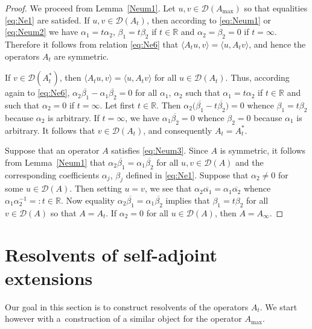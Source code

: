 \documentclass[10pt,a4paper]{amsart}
\numberwithin{equation}{section}
\begin{document}
 \begin{proof}
 We proceed from Lemma~\ref{Neum1}. Let $u,v \in{\mathcal D}(A_{\max})$ so that equalities \eqref{eq:Ne1} are satisfed.
 If $u,v \in{\mathcal D}(A_{t})$, then according to \eqref{eq:Neum1} or \eqref{eq:Neum2} we have $\alpha_{1}= t\alpha_{2}$, $\beta_{1}= t \beta_{2}$ if $t\in {\mathbb R}$ and $\alpha_2= \beta_{2}=0$ if $t=\infty$. Therefore it follows from relation \eqref{eq:Ne6} that $\langle A_{t}u,v \rangle= \langle u, A_{t} v \rangle$, and hence the operators $A_{t} $ are symmetric.

 If $v\in {\mathcal D}(A_{t}^*)$, then $\langle A_{t}u,v \rangle= \langle u, A_{t} v \rangle$ for all $u\in {\mathcal D}(A_{t})$.
 Thus, according again to \eqref{eq:Ne6}, $\alpha_{2} \overline{\beta_{1}}-\alpha_{1} \overline{\beta_{2}}=0$ for all $\alpha_{1}$, $\alpha_{2}$ such that $\alpha_{1}=t \alpha_{2}$ if $t\in {\mathbb R}$ and such that $ \alpha_{2}= 0$ if $t=\infty$.
 Let first $t\in {\mathbb R}$. Then $\alpha_{2} \big( \overline{\beta_{1}}- t \overline{\beta_{2}}\big)=0 $ whence $\beta_{1}=t\beta_{2}$ because $\alpha_{2}$ is arbitrary. If $t=\infty$, we have $\alpha_{1} \overline{\beta_{2}}=0$ whence $\beta_{2}=0$ because $\alpha_1$ is arbitrary. It follows that $v\in {\mathcal D}(A_{t})$, and consequently $A_{t}=A_{t}^*$.

Suppose that an operator $A$ satisfies \eqref{eq:Neum3}. Since $A$ is symmetric, it follows from Lemma~\ref{Neum1} that $\alpha_{2} \overline{\beta_{1}}=\alpha_{1} \overline{\beta_{2}}$ for all $u, v\in {\mathcal D} (A)$ and the corresponding coefficients $\alpha_{j}$, $\beta_{j}$ defined in \eqref{eq:Ne1}. Suppose that $\alpha_{2}\neq 0$ for some $u \in {\mathcal D} (A)$. Then setting $u=v$, we see that $\alpha_{2} \overline{\alpha_{1}}=\alpha_{1} \overline{\alpha_{2}}$ whence $ \alpha_{1}\alpha_{2}^{-1}=:t \in{\mathbb R}$. Now equality $\alpha_{2} \overline{\beta_{1}}=\alpha_{1} \overline{\beta_{2}}$ implies that
 $\beta_{1}= t \beta_{2}$ for all $v \in {\mathcal D} (A)$ so that $A=A_{t}$. If $\alpha_{2}= 0$ for all $u \in {\mathcal D} (A)$, then $A=A_\infty$.
 \end{proof}

\section{Resolvents of self-adjoint extensions}\label{section3}

 Our goal in this section is to construct resolvents of the operators $A_{t}$. We start however with a~construction of a similar object for the operator $A_{\max}$.
\end{document}
